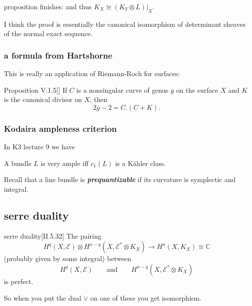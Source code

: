  \begin{thing7}{proposition finishes:}\leavevmode
 and thus \(K_X \cong (K_Y \otimes L)|_{X}\).
 \end{thing7}

 \begin{upshot}\leavevmode
 I think the proof is essentially the canonical isomorphism of determinant sheaves of the normal exact sequence.
 \end{upshot}

\subsubsection{a formula from Hartshorne}

This is really an application of Riemann-Roch for surfaces:

\begin{thing1}{Proposition V.1.5}[\cite{hart}]\leavevmode
If \(C\) is a nonsingular curve of genus \(g\) on the surface \(X\) and \(K\) is the canonical divisor on \(X\), then
\[2g-2=C.(C+K).\]

\end{thing1}

\subsubsection{Kodaira ampleness criterion}

In K3 lecture 9 we have

\begin{thm}[Kodaira]\leavevmode
A bundle \(L\) is very ample iff \(c_1(L)\) is a Kähler class.
\end{thm}

\begin{thing7}{Recall}\leavevmode
that a line bundle is \textit{\textbf{prequantizable}} if its curvature is symplectic and integral.
\end{thing7}

\subsection{serre duality}
\begin{thing6}{serre duality}[II.5.32\cite{voi}]\label{thm:5.32}\leavevmode
The pairing
\[H^{q}(X,\mathcal{E})\otimes H^{n-q}(X,\mathcal{E}^*\otimes K_X)\to H^{n}(X,K_X)\cong\mathbb{C}\]
(probably given by some integral) between
\[H^{q}(X,\mathcal{E})\qquad \text{and} \qquad H^{n-q}(X,\mathcal{E}^* \otimes K_X)\]
is perfect.
\end{thing6}
So when you put the dual \(\vee\) on one of these you get isomorphism.


